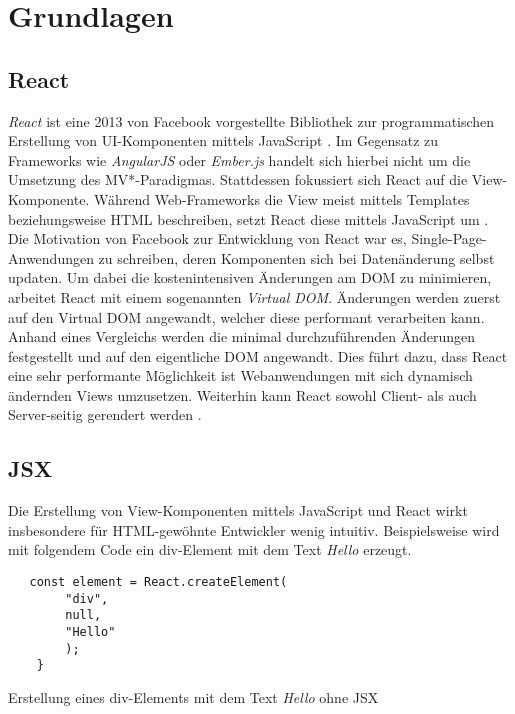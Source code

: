 \section{Grundlagen}

\subsection{React}
\textit{React} ist eine 2013 von Facebook vorgestellte Bibliothek zur programmatischen Erstellung von UI-Komponenten mittels JavaScript \cite{facebook_inc._react_2016}. Im Gegensatz zu Frameworks wie \textit{AngularJS} oder \textit{Ember.js} handelt sich hierbei nicht um die Umsetzung des MV*-Paradigmas. Stattdessen fokussiert sich React auf die View-Komponente. Während Web-Frameworks die View meist mittels Templates beziehungsweise HTML beschreiben, setzt React diese mittels JavaScript um \cite{hunt_why_2013}. Die Motivation von Facebook zur Entwicklung von React war es, Single-Page-Anwendungen zu schreiben, deren Komponenten sich bei Datenänderung selbst updaten. Um dabei die kostenintensiven Änderungen am DOM zu minimieren, arbeitet React mit einem sogenannten \textit{Virtual DOM}. Änderungen werden zuerst auf den Virtual DOM angewandt, welcher diese performant verarbeiten kann. Anhand eines Vergleichs werden die minimal durchzuführenden Änderungen festgestellt und auf den eigentliche DOM angewandt. Dies führt dazu, dass React eine sehr performante Möglichkeit ist Webanwendungen mit sich dynamisch ändernden Views umzusetzen. Weiterhin kann React sowohl Client- als auch Server-seitig gerendert werden \cite{hunt_why_2013}.
 
\subsection{JSX}
Die Erstellung von View-Komponenten mittels JavaScript und React wirkt insbesondere für HTML-gewöhnte Entwickler wenig intuitiv. Beispielsweise wird mit folgendem Code ein div-Element mit dem Text \textit{Hello} erzeugt.
\begin{listing}[H]
    \begin{verbatim}
   const element = React.createElement(
        "div",
        null,
        "Hello"
        );
    }
    \end{verbatim}
    \caption{Erstellung eines div-Elements mit dem Text \textit{Hello} ohne JSX}
    \label{lst:jsx_without_jsx}
\end{listing}

